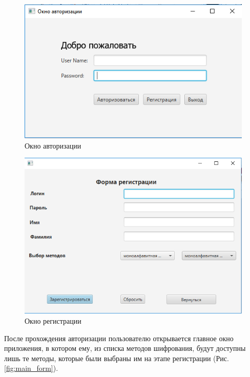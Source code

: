 \documentclass[a4paper,12pt]{article}
\begin{document}
\begin{center}
	\begin{figure}[h!]
		\centering
   		\includegraphics[scale=0.5]{img/login_form.png}
   		\caption{Окно авторизации}
   		\label{fig:login_form}
    \end{figure}
\end{center}
\begin{center}
	\begin{figure}[h!]
		\centering
   		\includegraphics[scale=0.5]{img/registry_form.png}
   		\caption{Окно регистрации}
   		\label{fig:registry_form}
    \end{figure}
\end{center}
После прохождения авторизации пользователю открывается главное окно приложения, в котором ему, из списка методов шифрования, будут доступны лишь те методы, которые были выбраны им на этапе регистрации (Рис. \ref{fig:main_form}).
\end{document}
